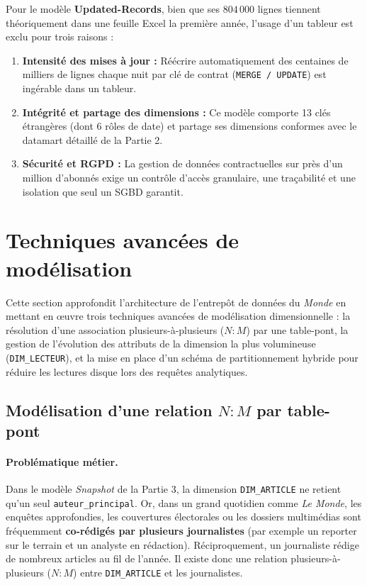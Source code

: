 \documentclass[a4paper,12pt]{article}
\begin{document}
Pour le modèle \textbf{Updated-Records}, bien que ses $804\,000$ lignes tiennent théoriquement dans une feuille Excel la première année, l'usage d'un tableur est exclu pour trois raisons :
\begin{enumerate}
  \item \textbf{Intensité des mises à jour :} Réécrire automatiquement des centaines de milliers de lignes chaque nuit par clé de contrat (\texttt{MERGE / UPDATE}) est ingérable dans un tableur.
  \item \textbf{Intégrité et partage des dimensions :} Ce modèle comporte 13 clés étrangères (dont 6 rôles de date) et partage ses dimensions conformes avec le datamart détaillé de la Partie 2.
  \item \textbf{Sécurité et RGPD :} La gestion de données contractuelles sur près d'un million d'abonnés exige un contrôle d'accès granulaire, une traçabilité et une isolation que seul un SGBD garantit.
\end{enumerate}


\newpage
\section{Techniques avancées de modélisation}

Cette section approfondit l'architecture de l'entrepôt de données du \emph{Monde} en mettant en œuvre trois techniques avancées de modélisation dimensionnelle : la résolution d'une association plusieurs-à-plusieurs ($N:M$) par une table-pont, la gestion de l'évolution des attributs de la dimension la plus volumineuse (\texttt{DIM\_LECTEUR}), et la mise en place d'un schéma de partitionnement hybride pour réduire les lectures disque lors des requêtes analytiques.

\subsection{Modélisation d'une relation $N:M$ par table-pont}

\paragraph{Problématique métier.}
Dans le modèle \emph{Snapshot} de la Partie 3, la dimension \texttt{DIM\_ARTICLE} ne retient qu'un seul \texttt{auteur\_principal}. Or, dans un grand quotidien comme \emph{Le Monde}, les enquêtes approfondies, les couvertures électorales ou les dossiers multimédias sont fréquemment \textbf{co-rédigés par plusieurs journalistes} (par exemple un reporter sur le terrain et un analyste en rédaction). Réciproquement, un journaliste rédige de nombreux articles au fil de l'année. Il existe donc une relation plusieurs-à-plusieurs ($N:M$) entre \texttt{DIM\_ARTICLE} et les journalistes.
\end{document}
